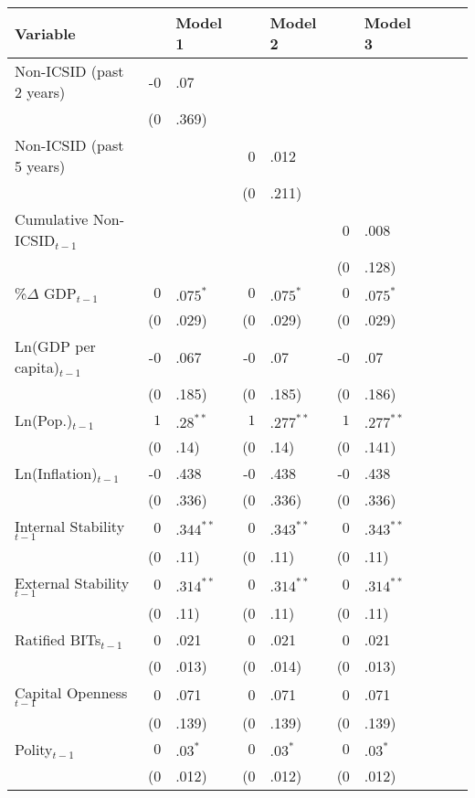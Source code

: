 \begin{enumerate}
\begin{itemize}
			\begin{table}[ht]
			\centering
			\begingroup\footnotesize
			\begin{tabular}{lr@{} lr@{}lr@{}lr@{}lr@{}}
			Variable && Model 1 && Model 2 && Model 3 \\ 
			  \hline
			\hline
			Non-ICSID (past 2 years) & -0&.07 &&  &&  \\ 
			   & (0&.369) &&  &&  \\ 
			  Non-ICSID (past 5 years) &&  & 0&.012 &&  \\ 
			   &  && (0&.211) &&  \\ 
			  Cumulative Non-ICSID$_{t-1}$ &  &&  && 0&.008 \\ 
			   &  &&  && (0&.128) \\ 
			  \%$\Delta$ GDP$_{t-1}$ & $0$&$.075^{\ast}$ & $0$&$.075^{\ast}$ & $0$&$.075^{\ast}$ \\ 
			   & (0&.029) & (0&.029) & (0&.029) \\ 
			  Ln(GDP per capita)$_{t-1}$ & -0&.067 & -0&.07 & -0&.07 \\ 
			   & (0&.185) & (0&.185) & (0&.186) \\ 
			  Ln(Pop.)$_{t-1}$ & $1$&$.28^{\ast\ast}$ & $1$&$.277^{\ast\ast}$ & $1$&$.277^{\ast\ast}$ \\ 
			   & (0&.14) & (0&.14) & (0&.141) \\ 
			  Ln(Inflation)$_{t-1}$ & -0&.438 & -0&.438 & -0&.438 \\ 
			   & (0&.336) & (0&.336) & (0&.336) \\ 
			  Internal Stability$_{t-1}$ & $0$&$.344^{\ast\ast}$ & $0$&$.343^{\ast\ast}$ & $0$&$.343^{\ast\ast}$ \\ 
			   & (0&.11) & (0&.11) & (0&.11) \\ 
			  External Stability$_{t-1}$ & $0$&$.314^{\ast\ast}$ & $0$&$.314^{\ast\ast}$ & $0$&$.314^{\ast\ast}$ \\ 
			   & (0&.11) & (0&.11) & (0&.11) \\ 
			  Ratified BITs$_{t-1}$ & 0&.021 & 0&.021 & 0&.021 \\ 
			   & (0&.013) & (0&.014) & (0&.013) \\ 
			  Capital Openness$_{t-1}$ & 0&.071 & 0&.071 & 0&.071 \\ 
			   & (0&.139) & (0&.139) & (0&.139) \\ 
			  Polity$_{t-1}$ & $0$&$.03^{\ast}$ & $0$&$.03^{\ast}$ & $0$&$.03^{\ast}$ \\ 
			   & (0&.012) & (0&.012) & (0&.012) \\ 

\end{tabular}
\end{table}
\end{itemize}
\end{enumerate}
